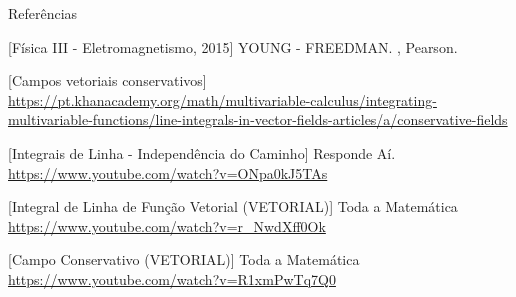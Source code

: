 \documentclass{beamer}
\begin{document}
\begin{frame}{Referências}
    \begin{thebibliography}{10}
        [Física III - Eletromagnetismo, 2015]
        YOUNG - FREEDMAN.
        ,
        \newblock Pearson.
        
        [Campos vetoriais conservativos]
        \newblock \url{https://pt.khanacademy.org/math/multivariable-calculus/integrating-multivariable-functions/line-integrals-in-vector-fields-articles/a/conservative-fields}
             
        [Integrais de Linha - Independência do Caminho]
        \newblock Responde Aí.
        \newblock \url{https://www.youtube.com/watch?v=ONpa0kJ5TAs}
             
        [Integral de Linha de Função Vetorial (VETORIAL)]
        \newblock Toda a Matemática
        \newblock \url{https://www.youtube.com/watch?v=r_NwdXff0Ok}

        [Campo Conservativo (VETORIAL)]
        \newblock Toda a Matemática
        \newblock \url{https://www.youtube.com/watch?v=R1xmPwTq7Q0}
        
    \end{thebibliography}
\end{frame}
\end{document}
